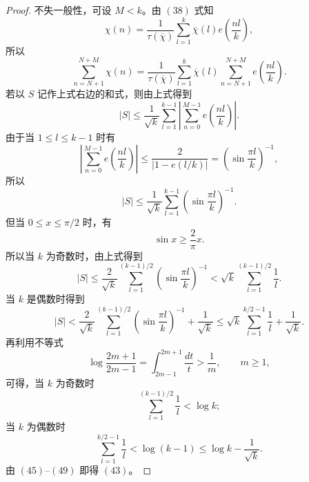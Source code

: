 \begin{proof}
	不失一般性，可设 $M<k$。由 \((38)\) 式知
	\[
		\chi(n)=
		\frac{1}{\tau(\overline{\chi})}
		\sum_{l=1}^{k}\overline{\chi}(l)e\left(\frac{nl}{k}\right),
	\]
	所以
	\[
		\sum_{n=N+1}^{N+M}\chi(n)
		=
		\frac{1}{\tau(\overline{\chi})}
		\sum_{l=1}^{k}\overline{\chi}(l)
		\sum_{n=N+1}^{N+M}e\left(\frac{nl}{k}\right).
	\]
	若以 $S$ 记作上式右边的和式，则由上式得到
	\begin{equation}
		|S|
		\leq
		\frac{1}{\sqrt{k}}
		\sum_{l=1}^{k-1}
		\left|
		\sum_{n=0}^{M-1}e\left(\frac{nl}{k}\right)
		\right|.
		\tag{44}
	\end{equation}
	由于当 $1\leq l\leq k-1$ 时有
	\[
		\left|
		\sum_{n=0}^{M-1}e\left(\frac{nl}{k}\right)
		\right|
		\leq
		\frac{2}{|1-e(l/k)|}
		=
		\left(\sin\frac{\pi l}{k}\right)^{-1},
	\]
	所以
	\begin{equation}
		|S|
		\leq
		\frac{1}{\sqrt{k}}
		\sum_{l=1}^{k-1}
		\left(\sin\frac{\pi l}{k}\right)^{-1}.
		\tag{45}
	\end{equation}
	但当 $0\leq x\leq \pi/2$ 时，有
	\[
		\sin x\geq \frac{2}{\pi}x.
	\]
	所以当 $k$ 为奇数时，由上式得到
	\begin{equation}
		|S|
		\leq
		\frac{2}{\sqrt{k}}
		\sum_{l=1}^{(k-1)/2}
		\left(\sin\frac{\pi l}{k}\right)^{-1}
		<
		\sqrt{k}
		\sum_{l=1}^{(k-1)/2}\frac{1}{l}.
		\tag{46}
	\end{equation}
	当 $k$ 是偶数时得到
	\begin{equation}
		|S|
		<
		\frac{2}{\sqrt{k}}
		\sum_{l=1}^{(k-1)/2}
		\left(\sin\frac{\pi l}{k}\right)^{-1}
		+
		\frac{1}{\sqrt{k}}
		\leq
		\sqrt{k}\sum_{l=1}^{k/2-1}\frac{1}{l}
		+
		\frac{1}{\sqrt{k}}.
		\tag{47}
	\end{equation}
	再利用不等式
	\[
		\log\frac{2m+1}{2m-1}
		=
		\int_{2m-1}^{2m+1}\frac{dt}{t}
		>
		\frac{1}{m},
		\qquad m\geq1,
	\]
	可得，当 $k$ 为奇数时
	\begin{equation}
		\sum_{l=1}^{(k-1)/2}\frac{1}{l}<\log k;
		\tag{48}
	\end{equation}
	当 $k$ 为偶数时
	\begin{equation}
		\sum_{l=1}^{k/2-1}\frac{1}{l}
		<
		\log(k-1)
		\leq
		\log k-\frac{1}{\sqrt{k}}.
		\tag{49}
	\end{equation}
	由 \((45)\)--\((49)\) 即得 \((43)\)。
\end{proof}
